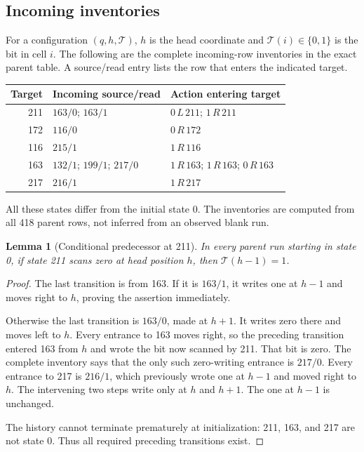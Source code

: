\documentclass[11pt,letterpaper]{article}
\newcommand{\Tape}{\mathcal T}
\newcommand{\act}[3]{#1\,#2\,#3}
\newtheorem{lemma}[theorem]{Lemma}
\begin{document}
\subsection{Incoming inventories}

For a configuration $(q,h,\Tape)$, $h$ is the head coordinate and
$\Tape(i)\in\{0,1\}$ is the bit in cell $i$. The following are the complete
incoming-row inventories in the exact parent table. A source/read entry
lists the row that enters the indicated target.

\begin{center}
\begin{tabular}{@{}rll@{}}
\toprule
Target & Incoming source/read & Action entering target\\
\midrule
211 & $163/0$; $163/1$ & $\act0L{211}$; $\act1R{211}$\\
172 & $116/0$ & $\act0R{172}$\\
116 & $215/1$ & $\act1R{116}$\\
163 & $132/1$; $199/1$; $217/0$ & $\act1R{163}$; $\act1R{163}$; $\act0R{163}$\\
217 & $216/1$ & $\act1R{217}$\\
\bottomrule
\end{tabular}
\end{center}

All these states differ from the initial state 0. The inventories are
computed from all 418 parent rows, not inferred from an observed blank run.

\begin{lemma}[Conditional predecessor at 211]\label{lem:211}
In every parent run starting in state 0, if state 211 scans zero at head
position $h$, then $\Tape(h-1)=1$.
\end{lemma}
\begin{proof}
The last transition is from 163. If it is $163/1$, it writes one at $h-1$
and moves right to $h$, proving the assertion immediately.

Otherwise the last transition is $163/0$, made at $h+1$. It writes zero
there and moves left to $h$. Every entrance to 163 moves right, so the
preceding transition entered 163 from $h$ and wrote the bit now scanned
by 211. That bit is zero. The complete inventory says that the only such
zero-writing entrance is $217/0$. Every entrance to 217 is $216/1$, which
previously wrote one at $h-1$ and moved right to $h$. The intervening two
steps write only at $h$ and $h+1$. The one at $h-1$ is unchanged.

The history cannot terminate prematurely at initialization: 211, 163, and
217 are not state 0. Thus all required preceding transitions exist.
\end{proof}
\end{document}

